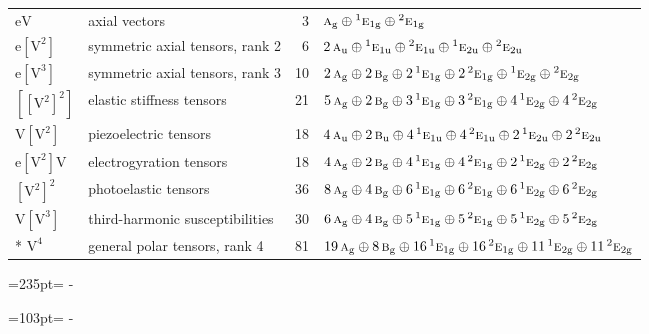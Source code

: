 \documentclass[10pt,a4paper]{article}
\newcommand{\needspace}[1]{\par\penalty-100\begingroup\dimen0=#1\relax\dimen2=\pagegoal
  \advance\dimen2-\pagetotal\ifdim\dimen0>\dimen2\relax\ifdim\dimen2>0pt\vfil\break\fi\fi
  \endgroup}
\numberwithin{equation}{section}
\newcommand{\irr}[1]{\text{\normalfont\scshape #1}}
\newcommand{\conjpair}[1]{{}^{#1}}
\newcommand{\ptag}[1]{\mathrm{#1}}
\newcommand{\jahn}[1]{\mathrm{#1}}
\newlength{\fillwidth}\newlength{\cellwidth}\newlength{\colwidth}
\begin{document}
{\begin{longtable}{@{}llr>{\RaggedRight\arraybackslash}p{\fillwidth}@{}}
$\jahn{eV}$ & axial vectors & 3 & $\irr{a}_{\ptag{g}} \oplus\allowbreak \conjpair{1}\irr{e}_{1\ptag{g}} \oplus\allowbreak \conjpair{2}\irr{e}_{1\ptag{g}}$\\
$\jahn{e[V^{2}]}$ & symmetric axial tensors, rank 2 & 6 & $2\,\irr{a}_{\ptag{u}} \oplus\allowbreak \conjpair{1}\irr{e}_{1\ptag{u}} \oplus\allowbreak \conjpair{2}\irr{e}_{1\ptag{u}} \oplus\allowbreak \conjpair{1}\irr{e}_{2\ptag{u}} \oplus\allowbreak \conjpair{2}\irr{e}_{2\ptag{u}}$\\
$\jahn{e[V^{3}]}$ & symmetric axial tensors, rank 3 & 10 & $2\,\irr{a}_{\ptag{g}} \oplus\allowbreak 2\,\irr{b}_{\ptag{g}} \oplus\allowbreak 2\,\conjpair{1}\irr{e}_{1\ptag{g}} \oplus\allowbreak 2\,\conjpair{2}\irr{e}_{1\ptag{g}} \oplus\allowbreak \conjpair{1}\irr{e}_{2\ptag{g}} \oplus\allowbreak \conjpair{2}\irr{e}_{2\ptag{g}}$\\
$\jahn{[[V^{2}]^{2}]}$ & elastic stiffness tensors & 21 & $5\,\irr{a}_{\ptag{g}} \oplus\allowbreak 2\,\irr{b}_{\ptag{g}} \oplus\allowbreak 3\,\conjpair{1}\irr{e}_{1\ptag{g}} \oplus\allowbreak 3\,\conjpair{2}\irr{e}_{1\ptag{g}} \oplus\allowbreak 4\,\conjpair{1}\irr{e}_{2\ptag{g}} \oplus\allowbreak 4\,\conjpair{2}\irr{e}_{2\ptag{g}}$\\
$\jahn{V[V^{2}]}$ & piezoelectric tensors & 18 & $4\,\irr{a}_{\ptag{u}} \oplus\allowbreak 2\,\irr{b}_{\ptag{u}} \oplus\allowbreak 4\,\conjpair{1}\irr{e}_{1\ptag{u}} \oplus\allowbreak 4\,\conjpair{2}\irr{e}_{1\ptag{u}} \oplus\allowbreak 2\,\conjpair{1}\irr{e}_{2\ptag{u}} \oplus\allowbreak 2\,\conjpair{2}\irr{e}_{2\ptag{u}}$\\
$\jahn{e[V^{2}]V}$ & electrogyration tensors & 18 & $4\,\irr{a}_{\ptag{g}} \oplus\allowbreak 2\,\irr{b}_{\ptag{g}} \oplus\allowbreak 4\,\conjpair{1}\irr{e}_{1\ptag{g}} \oplus\allowbreak 4\,\conjpair{2}\irr{e}_{1\ptag{g}} \oplus\allowbreak 2\,\conjpair{1}\irr{e}_{2\ptag{g}} \oplus\allowbreak 2\,\conjpair{2}\irr{e}_{2\ptag{g}}$\\
$\jahn{[V^{2}]^{2}}$ & photoelastic tensors & 36 & $8\,\irr{a}_{\ptag{g}} \oplus\allowbreak 4\,\irr{b}_{\ptag{g}} \oplus\allowbreak 6\,\conjpair{1}\irr{e}_{1\ptag{g}} \oplus\allowbreak 6\,\conjpair{2}\irr{e}_{1\ptag{g}} \oplus\allowbreak 6\,\conjpair{1}\irr{e}_{2\ptag{g}} \oplus\allowbreak 6\,\conjpair{2}\irr{e}_{2\ptag{g}}$\\
$\jahn{V[V^{3}]}$ & third-harmonic susceptibilities & 30 & $6\,\irr{a}_{\ptag{g}} \oplus\allowbreak 4\,\irr{b}_{\ptag{g}} \oplus\allowbreak 5\,\conjpair{1}\irr{e}_{1\ptag{g}} \oplus\allowbreak 5\,\conjpair{2}\irr{e}_{1\ptag{g}} \oplus\allowbreak 5\,\conjpair{1}\irr{e}_{2\ptag{g}} \oplus\allowbreak 5\,\conjpair{2}\irr{e}_{2\ptag{g}}$\\*
$\jahn{V^{4}}$ & general polar tensors, rank 4 & 81 & $19\,\irr{a}_{\ptag{g}} \oplus\allowbreak 8\,\irr{b}_{\ptag{g}} \oplus\allowbreak 16\,\conjpair{1}\irr{e}_{1\ptag{g}} \oplus\allowbreak 16\,\conjpair{2}\irr{e}_{1\ptag{g}} \oplus\allowbreak 11\,\conjpair{1}\irr{e}_{2\ptag{g}} \oplus\allowbreak 11\,\conjpair{2}\irr{e}_{2\ptag{g}}$\\
\bottomrule\end{longtable}}
\needspace{235pt}
\needspace{103pt}
\end{document}

